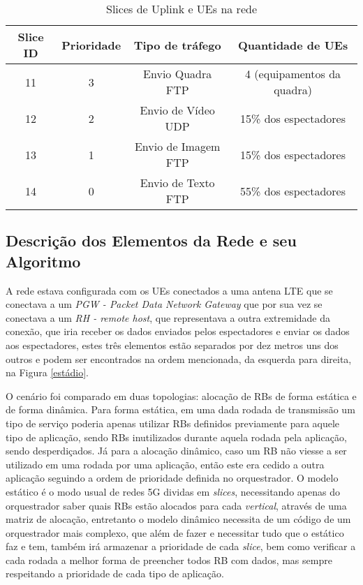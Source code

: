 \documentclass[12pt, a4paper]{article}
\begin{document}
\begin{table*}[!htb]
	\setlength{\tabcolsep}{5mm}
	\centering
	\begin{tabular}{c|c|c|c}
		\toprule
		Slice ID & Prioridade & Tipo de tráfego & Quantidade de UEs 
		\\
		\midrule
		11 & 3 & Envio Quadra FTP & 4 (equipamentos da quadra)
		\\
		12 & 2 & Envio de Vídeo UDP & 15\% dos espectadores
		\\
		13 & 1 & Envio de Imagem FTP & 15\% dos espectadores
		\\
		14 & 0 & Envio de Texto FTP & 55\% dos espectadores
		\\
		\bottomrule
	\end{tabular}
	\caption{Slices de Uplink e UEs na rede}
	\label{canais uplink}
\end{table*}

\subsection{Descrição dos Elementos da Rede e seu Algoritmo}

A rede estava configurada com os UEs conectados a uma antena LTE que se conectava a um \textit{PGW - Packet Data Network Gateway} que por sua vez se conectava a um \textit{RH - remote host}, que representava a outra extremidade da conexão, que iria receber os dados enviados pelos espectadores e enviar os dados aos espectadores, estes três elementos estão separados por dez metros uns dos outros e podem ser encontrados na ordem mencionada, da esquerda para direita, na Figura \ref{estádio}.

O cenário foi comparado em duas topologias: alocação de RBs de forma estática e de forma dinâmica. Para forma estática, em uma dada rodada de transmissão um tipo de serviço poderia apenas utilizar RBs definidos previamente para aquele tipo de aplicação, sendo RBs inutilizados durante aquela rodada pela aplicação, sendo desperdiçados. Já para a alocação dinâmico, caso um RB não viesse a ser utilizado em uma rodada por uma aplicação, então este era cedido a outra aplicação seguindo a ordem de prioridade definida no orquestrador. O modelo estático é o modo usual de redes 5G dividas em \textit{slices}, necessitando apenas do orquestrador saber quais RBs estão alocados para cada \textit{vertical}, através de uma matriz de alocação, entretanto o modelo dinâmico necessita de um código de um orquestrador mais complexo, que além de fazer e necessitar tudo que o estático faz e tem, também irá armazenar a prioridade de cada \textit{slice}, bem como verificar a cada rodada a melhor forma de preencher todos RB com dados, mas sempre respeitando a prioridade de cada tipo de aplicação.
\end{document}
